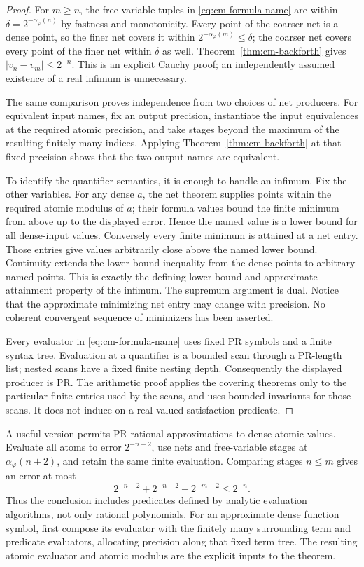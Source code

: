\begin{proof}
For $m\geq n$, the free-variable tuples in \eqref{eq:cm-formula-name} are
within $\delta=2^{-\alpha_\varphi(n)}$ by fastness and monotonicity.  Every
point of the coarser net is a dense point, so the finer net covers it within
$2^{-\alpha_\varphi(m)}\leq\delta$; the coarser net covers every point of
the finer net within $\delta$ as well.  Theorem~\ref{thm:cm-backforth} gives
$|v_n-v_m|\leq2^{-n}$.  This is an explicit Cauchy proof; an independently
assumed existence of a real infimum is unnecessary.

The same comparison proves independence from two choices of net producers.
For equivalent input names, fix an output precision, instantiate the
input equivalences at the required atomic precision, and take stages beyond
the maximum of the resulting finitely many indices.  Applying
Theorem~\ref{thm:cm-backforth} at that fixed precision shows that the two
output names are equivalent.

To identify the quantifier semantics, it is enough to handle an infimum.
Fix the other variables.  For any dense $a$, the net theorem supplies points
within the required atomic modulus of $a$; their formula values bound the
finite minimum from above up to the displayed error.  Hence the named value
is a lower bound for all dense-input values.  Conversely every finite
minimum is attained at a net entry.  Those entries give values arbitrarily
close above the named lower bound.  Continuity extends the lower-bound
inequality from the dense points to arbitrary named points.  This is exactly
the defining lower-bound and approximate-attainment property of the infimum.
The supremum argument is dual.  Notice that the approximate minimizing net
entry may change with precision.  No coherent convergent sequence of
minimizers has been asserted.

Every evaluator in \eqref{eq:cm-formula-name} uses fixed PR symbols and a
finite syntax tree.  Evaluation at a quantifier is a bounded scan through a
PR-length list; nested scans have a fixed finite nesting depth.  Consequently
the displayed producer is PR.  The arithmetic proof applies the covering
theorems only to the particular finite entries used by the scans, and uses
bounded invariants for those scans.  It does not induce on a real-valued
satisfaction predicate.
\end{proof}

A useful version permits PR rational approximations to dense atomic values.
Evaluate all atoms to error $2^{-n-2}$, use nets and free-variable stages at
$\alpha_\varphi(n+2)$, and retain the same finite evaluation.  Comparing
stages $n\leq m$ gives an error at most
\[
                2^{-n-2}+2^{-n-2}+2^{-m-2}\leq 2^{-n}.
\]
Thus the conclusion includes predicates defined by analytic evaluation
algorithms, not only rational polynomials.  For an approximate dense function
symbol, first compose its evaluator with the finitely many surrounding term
and predicate evaluators, allocating precision along that fixed term tree.
The resulting atomic evaluator and atomic modulus are the explicit inputs to
the theorem.

